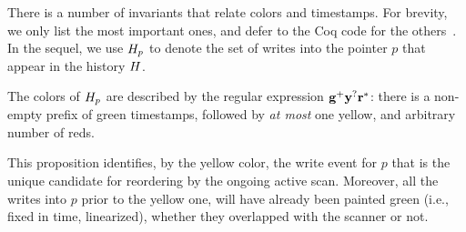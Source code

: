 There is a number of invariants that relate colors and timestamps. For
brevity, we only list the most important ones, and defer to the Coq
code for the others~\cite{CoqFiles}. In the sequel, we use
$H_p$ to denote the set of writes into the pointer $p$ that appear
in the history $H$.

\begin{proposition}\label{inv:color}%
The colors of $H_p$ are described by the regular expression ${\mathbf{{g^{+}}{y^{?}}{r^{*}}}}$:
there is a non-empty prefix of green timestamps, followed by \emph{at
  most} one yellow, and arbitrary number of reds.
\end{proposition}

This proposition identifies, by the yellow color, the write event for
$p$ that is the unique candidate for reordering by the ongoing active
scan. Moreover, all the writes into $p$ prior to the yellow one, will
have already been painted green (i.e., fixed in time, linearized),
whether they overlapped with the scanner or not.

